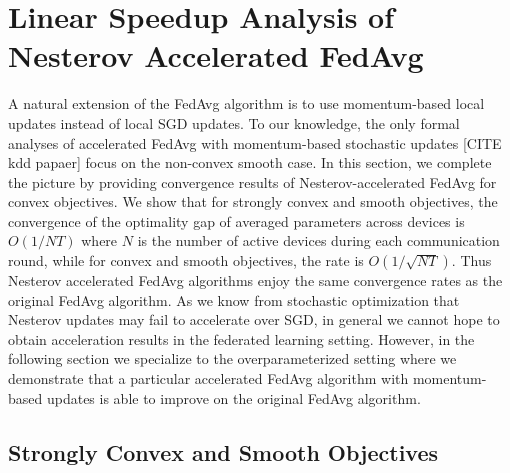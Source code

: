 


\section{Linear Speedup Analysis of Nesterov Accelerated FedAvg}

A natural extension of the FedAvg algorithm is to use momentum-based
local updates instead of local SGD updates. To our knowledge, the
only formal analyses of accelerated FedAvg with momentum-based stochastic
updates {[}CITE kdd papaer{]} focus on the non-convex smooth case.
In this section, we complete the picture by providing convergence
results of Nesterov-accelerated FedAvg for convex objectives. We show
that for strongly convex and smooth objectives, the convergence of
the optimality gap of averaged parameters across devices is $O(1/NT)$
where $N$ is the number of active devices during each communication
round, while for convex and smooth objectives, the rate is $O(1/\sqrt{NT})$.
Thus Nesterov accelerated FedAvg algorithms enjoy the same convergence
rates as the original FedAvg algorithm. As we know from stochastic
optimization that Nesterov updates may fail to accelerate over SGD,
in general we cannot hope to obtain acceleration results in the federated
learning setting. However, in the following section we specialize
to the overparameterized setting where we demonstrate that a particular
accelerated FedAvg algorithm with momentum-based updates is able to
improve on the original FedAvg algorithm. 

\subsection{Strongly Convex and Smooth Objectives}

